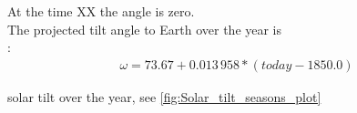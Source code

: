 At the time XX the angle is zero.\\

The projected tilt angle to Earth over the year is\\

% 
% 

\citet{Hapgood1992}:
\begin{align}
	\omega = 73.67 + 0.013\,958 * (today - 1850.0)	%
\end{align}
% 
% 


% 

solar tilt over the year, see \autoref{fig:Solar_tilt_seasons_plot}
\begin{figure}[htb]
\end{figure}

